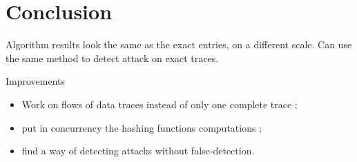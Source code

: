 \documentclass[mathserif]{beamer}
\begin{document}
\section*{Conclusion}

	\begin{frame}
		\begin{block}{}
			Algorithm results look the same as the exact entries, on a different scale. Can use the same method to detect attack on exact traces.
		\end{block}
		
		\begin{block}{Improvements}
			\begin{itemize}
				\item Work on flows of data traces instead of only one complete trace ;
				\item put in concurrency the hashing functions computations	;
				\item find a way of detecting attacks without false-detection.
			\end{itemize}
		\end{block}
	\end{frame}
\end{document}

